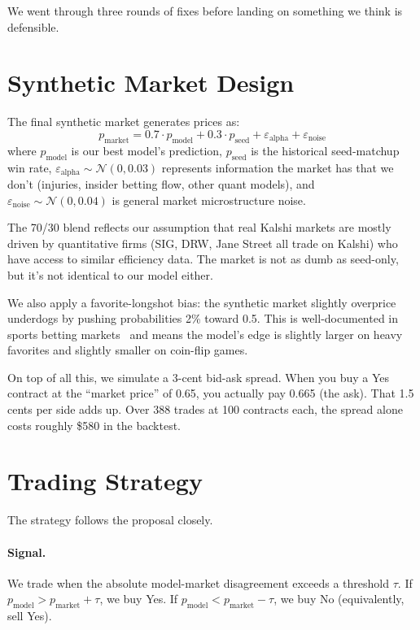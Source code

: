 \documentclass[11pt,a4paper]{article}
\begin{document}
We went through three rounds of fixes before landing on something we think is defensible.


\section{Synthetic Market Design}

The final synthetic market generates prices as:
\[
p_{\text{market}} = 0.7 \cdot p_{\text{model}} + 0.3 \cdot p_{\text{seed}} + \varepsilon_{\text{alpha}} + \varepsilon_{\text{noise}}
\]
where $p_{\text{model}}$ is our best model's prediction, $p_{\text{seed}}$ is the historical seed-matchup win rate, $\varepsilon_{\text{alpha}} \sim \mathcal{N}(0, 0.03)$ represents information the market has that we don't (injuries, insider betting flow, other quant models), and $\varepsilon_{\text{noise}} \sim \mathcal{N}(0, 0.04)$ is general market microstructure noise.

The 70/30 blend reflects our assumption that real Kalshi markets are mostly driven by quantitative firms (SIG, DRW, Jane Street all trade on Kalshi) who have access to similar efficiency data. The market is not as dumb as seed-only, but it's not identical to our model either.

We also apply a favorite-longshot bias: the synthetic market slightly overprice underdogs by pushing probabilities 2\% toward 0.5. This is well-documented in sports betting markets~\citep{snowberg2010} and means the model's edge is slightly larger on heavy favorites and slightly smaller on coin-flip games.

On top of all this, we simulate a 3-cent bid-ask spread. When you buy a Yes contract at the ``market price'' of 0.65, you actually pay 0.665 (the ask). That 1.5 cents per side adds up. Over 388 trades at 100 contracts each, the spread alone costs roughly \$580 in the backtest.


\section{Trading Strategy}

The strategy follows the proposal closely.

\paragraph{Signal.} We trade when the absolute model-market disagreement exceeds a threshold $\tau$. If $p_{\text{model}} > p_{\text{market}} + \tau$, we buy Yes. If $p_{\text{model}} < p_{\text{market}} - \tau$, we buy No (equivalently, sell Yes).
\end{document}
